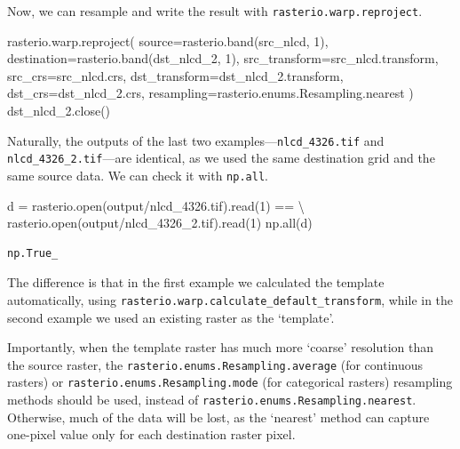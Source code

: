 \documentclass[
  letterpaper,
]{krantz}
\newenvironment{Shaded}{\begin{snugshade}}{\end{snugshade}}
\newcommand{\BuiltInTok}[1]{\textcolor[rgb]{0.00,0.23,0.31}{#1}}
\newcommand{\DecValTok}[1]{\textcolor[rgb]{0.68,0.00,0.00}{#1}}
\newcommand{\NormalTok}[1]{\textcolor[rgb]{0.00,0.23,0.31}{#1}}
\newcommand{\OperatorTok}[1]{\textcolor[rgb]{0.37,0.37,0.37}{#1}}
\newcommand{\StringTok}[1]{\textcolor[rgb]{0.13,0.47,0.30}{#1}}
\begin{document}
Now, we can resample and write the result with
\texttt{rasterio.warp.reproject}.

\begin{Shaded}
\begin{Highlighting}[]
\NormalTok{rasterio.warp.reproject(}
\NormalTok{    source}\OperatorTok{=}\NormalTok{rasterio.band(src\_nlcd, }\DecValTok{1}\NormalTok{),}
\NormalTok{    destination}\OperatorTok{=}\NormalTok{rasterio.band(dst\_nlcd\_2, }\DecValTok{1}\NormalTok{),}
\NormalTok{    src\_transform}\OperatorTok{=}\NormalTok{src\_nlcd.transform,}
\NormalTok{    src\_crs}\OperatorTok{=}\NormalTok{src\_nlcd.crs,}
\NormalTok{    dst\_transform}\OperatorTok{=}\NormalTok{dst\_nlcd\_2.transform,}
\NormalTok{    dst\_crs}\OperatorTok{=}\NormalTok{dst\_nlcd\_2.crs,}
\NormalTok{    resampling}\OperatorTok{=}\NormalTok{rasterio.enums.Resampling.nearest}
\NormalTok{)}
\NormalTok{dst\_nlcd\_2.close()}
\end{Highlighting}
\end{Shaded}

Naturally, the outputs of the last two
examples---\texttt{nlcd\_4326.tif} and \texttt{nlcd\_4326\_2.tif}---are
identical, as we used the same destination grid and the same source
data. We can check it with \texttt{np.all}.

\begin{Shaded}
\begin{Highlighting}[]
\NormalTok{d }\OperatorTok{=}\NormalTok{ rasterio.}\BuiltInTok{open}\NormalTok{(}\StringTok{\textquotesingle{}output/nlcd\_4326.tif\textquotesingle{}}\NormalTok{).read(}\DecValTok{1}\NormalTok{) }\OperatorTok{==} \OperatorTok{\textbackslash{}}
\NormalTok{    rasterio.}\BuiltInTok{open}\NormalTok{(}\StringTok{\textquotesingle{}output/nlcd\_4326\_2.tif\textquotesingle{}}\NormalTok{).read(}\DecValTok{1}\NormalTok{)}
\NormalTok{np.}\BuiltInTok{all}\NormalTok{(d)}
\end{Highlighting}
\end{Shaded}

\begin{verbatim}
np.True_
\end{verbatim}

The difference is that in the first example we calculated the template
automatically, using
\texttt{rasterio.warp.calculate\_default\_transform}, while in the
second example we used an existing raster as the `template'.

Importantly, when the template raster has much more `coarse' resolution
than the source raster, the \texttt{rasterio.enums.Resampling.average}
(for continuous rasters) or \texttt{rasterio.enums.Resampling.mode} (for
categorical rasters) resampling methods should be used, instead of
\texttt{rasterio.enums.Resampling.nearest}. Otherwise, much of the data
will be lost, as the `nearest' method can capture one-pixel value only
for each destination raster pixel.
\end{document}
